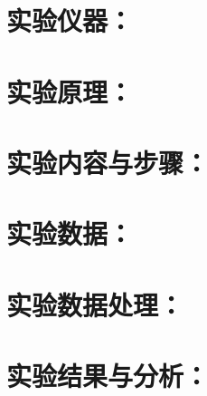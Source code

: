 \documentclass{USTBReport}
\begin{document}
\section{实验仪器：}

\section{实验原理：}

\section{实验内容与步骤：}

\section{实验数据：}

\section{实验数据处理：}

\section{实验结果与分析：}

\end{document}
